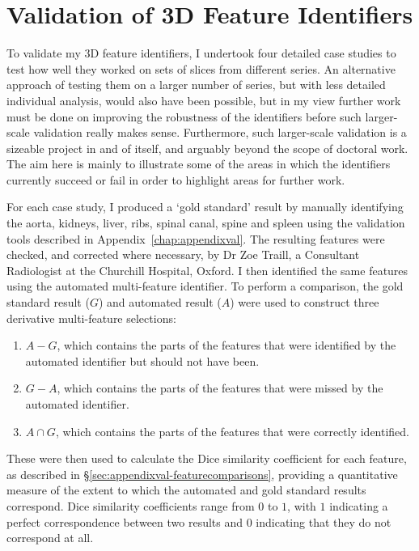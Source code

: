 
\section{Validation of 3D Feature Identifiers}


To validate my 3D feature identifiers, I undertook four detailed case studies to test how well they worked on sets of slices from different series. An alternative approach of testing them on a larger number of series, but with less detailed individual analysis, would also have been possible, but in my view further work must be done on improving the robustness of the identifiers before such larger-scale validation really makes sense. Furthermore, such larger-scale validation is a sizeable project in and of itself, and arguably beyond the scope of doctoral work. The aim here is mainly to illustrate some of the areas in which the identifiers currently succeed or fail in order to highlight areas for further work.

For each case study, I produced a `gold standard' result by manually identifying the aorta, kidneys, liver, ribs, spinal canal, spine and spleen using the validation tools described in Appendix~\ref{chap:appendixval}. The resulting features were checked, and corrected where necessary, by Dr Zoe Traill, a Consultant Radiologist at the Churchill Hospital, Oxford. I then identified the same features using the automated multi-feature identifier. To perform a comparison, the gold standard result ($G$) and automated result ($A$) were used to construct three derivative multi-feature selections:
%
\begin{enumerate}
\item $A - G$, which contains the parts of the features that were identified by the automated identifier but should not have been.
\item $G - A$, which contains the parts of the features that were missed by the automated identifier.
\item $A \cap G$, which contains the parts of the features that were correctly identified.
\end{enumerate}
%
These were then used to calculate the Dice similarity coefficient \cite{dice45} for each feature, as described in \S\ref{sec:appendixval-featurecomparisons}, providing a quantitative measure of the extent to which the automated and gold standard results correspond. Dice similarity coefficients range from $0$ to $1$, with $1$ indicating a perfect correspondence between two results and $0$ indicating that they do not correspond at all.

